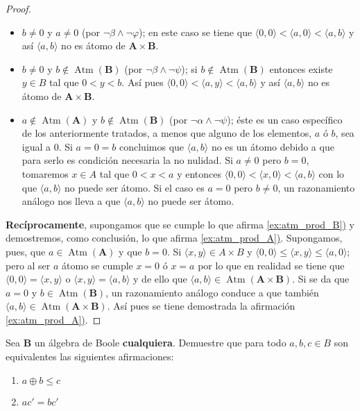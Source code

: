\begin{proof}
\begin{itemize}
\item $b\neq 0$ y $a\neq 0$ (por $\neg\beta\wedge\neg\varphi$); en
  este caso se tiene que
  $\langle 0,0\rangle<\langle a,0\rangle<\langle a,b\rangle$ y
  así $\langle a,b\rangle$ no es átomo de $\mathbf{A}\times\mathbf{B}$.
\item $b\neq 0$ y $b\notin \operatorname{Atm}(\mathbf{B})$
  (por $\neg\beta\wedge\neg\psi$); si
  $b\notin\operatorname{Atm}(\mathbf{B})$ entonces existe $y\in B$ tal
  que $0<y<b$. Así pues
  $\langle 0,0\rangle<\langle a,y\rangle<\langle a,b\rangle$ y
  así $\langle a,b\rangle$ no es átomo de
  $\mathbf{A}\times\mathbf{B}$.
\item $a\notin\operatorname{Atm}(\mathbf{A})$ y
  $b\notin \operatorname{Atm}(\mathbf{B})$ (por
  $\neg\alpha\wedge\neg\psi$); éste es un caso específico de los
  anteriormente tratados, a menos que alguno de los elementos, $a$ ó
  $b$, sea igual a $0$. Si $a=0=b$ concluimos que $\langle a,b\rangle$
  no es un átomo debido a que para serlo es condición necesaria la no
  nulidad. Si $a\neq 0$ pero $b=0$, tomaremos $x\in A$ tal que $0<x<a$
  y entonces
  $\langle 0,0\rangle<\langle x,0\rangle<\langle a,b\rangle$ con lo
  que $\langle a,b\rangle$ no puede ser átomo. Si el caso es $a=0$
  pero $b\neq 0$, un razonamiento análogo nos lleva a que
  $\langle a,b\rangle$ no puede ser átomo.
\end{itemize}
\textbf{Recíprocamente}, supongamos que se cumple lo que afirma
\hyperref[ex:atm_prod_B]{\ref*{ex:atm_prod_B})} y demostremos, como
conclusión, lo que afirma
\hyperref[ex:atm_prod_A]{\ref*{ex:atm_prod_A})}. Supongamos, pues, que
$a\in \operatorname{Atm}(\mathbf{A})$ y que $b=0$. Si
$\langle x,y\rangle\in A\times B$ y
$\langle 0,0\rangle\leq\langle x,y\rangle\leq\langle a,0\rangle$; pero
al ser $a$ átomo se cumple $x=0$ ó $x=a$ por lo que en realidad se
tiene que $\langle 0,0\rangle=\langle x,y\rangle$ o
$\langle x,y\rangle=\langle a,b\rangle$ y de ello que
$\langle a,b\rangle\in
\operatorname{Atm}(\mathbf{A}\times\mathbf{B})$. Si se da que $a=0$ y
$b\in \operatorname{Atm}(\mathbf{B})$, un razonamiento análogo conduce
a que también
$\langle a,b\rangle\in
\operatorname{Atm}(\mathbf{A}\times\mathbf{B})$. Así pues se tiene
demostrada la afirmación
\hyperref[ex:atm_prod_A]{\ref*{ex:atm_prod_A})}.
\end{proof}

\begin{exercise}
 Sea $\mathbf{B}$ un álgebra de Boole
  \textbf{cualquiera}. Demuestre que para todo $a,b,c\in B$ son
  equivalentes las siguientes afirmaciones:
  \begin{enumerate}
  \item $a\oplus b\leq c$
  \item $ac'=bc'$
  \end{enumerate}
\end{exercise}

